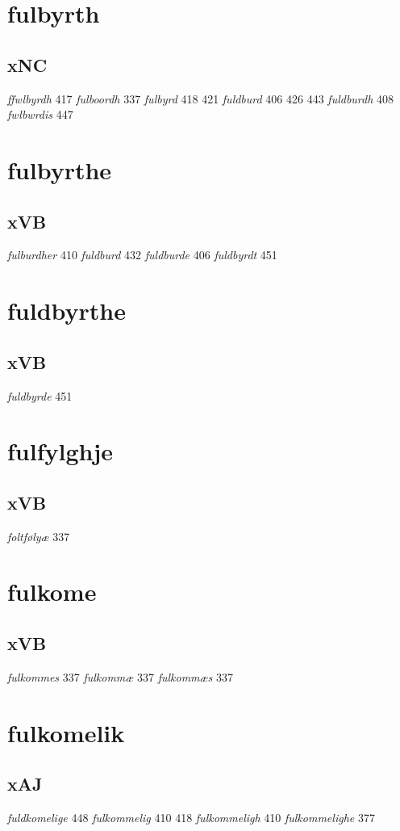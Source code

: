 \documentclass[a4paper,twocolumn]{article}
\begin{document}
\section{fulbyrth}
\label{sec:org717e6e9}
\subsection{xNC}
\label{sec:org49c1eeb}
\emph{ffwlbyrdh} 417 \emph{fulboordh} 337 \emph{fulbyrd} 418 421 \emph{fuldburd} 406 426 443 \emph{fuldburdh} 408 \emph{fwlbwrdis} 447 
\section{fulbyrthe}
\label{sec:org8fd2aad}
\subsection{xVB}
\label{sec:org2576f28}
\emph{fulburdher} 410 \emph{fuldburd} 432 \emph{fuldburde} 406 \emph{fuldbyrdt} 451 
\section{fuldbyrthe}
\label{sec:org9609799}
\subsection{xVB}
\label{sec:org50ca330}
\emph{fuldbyrde} 451 
\section{fulfylghje}
\label{sec:org85b1f3b}
\subsection{xVB}
\label{sec:org8f2da22}
\emph{foltfølyæ} 337 
\section{fulkome}
\label{sec:orge653a44}
\subsection{xVB}
\label{sec:org2a0fa74}
\emph{fulkommes} 337 \emph{fulkommæ} 337 \emph{fulkommæs} 337 
\section{fulkomelik}
\label{sec:org4b10f5d}
\subsection{xAJ}
\label{sec:org7ea45ab}
\emph{fuldkomelige} 448 \emph{fulkommelig} 410 418 \emph{fulkommeligh} 410 \emph{fulkommelighe} 377 
\end{document}
